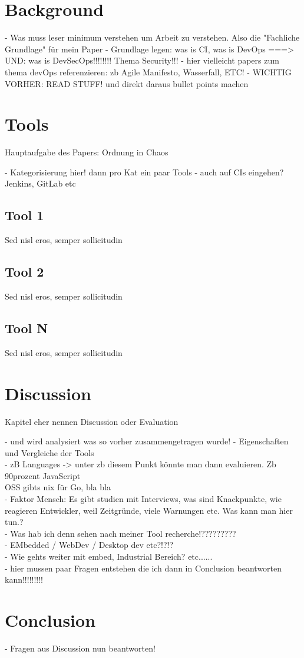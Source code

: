 \documentclass[conference]{IEEEtran}
\begin{document}
\section{Background}


- Was muss leser minimum verstehen um Arbeit zu verstehen. Also die "Fachliche Grundlage" für mein Paper
- Grundlage legen: was is CI, was is DevOps ===> UND: was is DevSecOps!!!!!!!! Thema Security!!!
- hier vielleicht papers zum thema devOps referenzieren: zb Agile Manifesto, Wasserfall, ETC!
- WICHTIG VORHER: READ STUFF! und direkt daraus bullet points machen


\section{Tools}
Hauptaufgabe des Papers: Ordnung in Chaos

- Kategorisierung hier! dann pro Kat ein paar Tools
- auch auf CIs eingehen? Jenkins, GitLab etc


\subsection{Tool 1}
Sed nisl eros, semper sollicitudin

\subsection{Tool 2}
Sed nisl eros, semper sollicitudin

\subsection{Tool N}
Sed nisl eros, semper sollicitudin

\section{Discussion}


Kapitel eher nennen Discussion oder Evaluation

- und wird analysiert was so vorher zusammengetragen wurde!
- Eigenschaften und Vergleiche der Tools\\
- zB Languages -> unter zb diesem Punkt könnte man dann evaluieren. Zb 90prozent JavaScript\\
OSS gibts nix für Go, bla bla\\
- Faktor Mensch: Es gibt studien mit Interviews, was sind Knackpunkte, wie reagieren Entwickler, weil Zeitgründe, viele Warnungen etc. Was kann man hier tun.?\\
- Was hab ich denn sehen nach meiner Tool recherche!?????????\\
- EMbedded / WebDev / Desktop dev etc?!?!?\\
- Wie gehts weiter mit embed, Industrial Bereich? etc......\\
- hier mussen paar Fragen entstehen die ich dann in Conclusion beantworten kann!!!!!!!!!\\


\section{Conclusion}

- Fragen aus Discussion nun beantworten!





\end{document}
